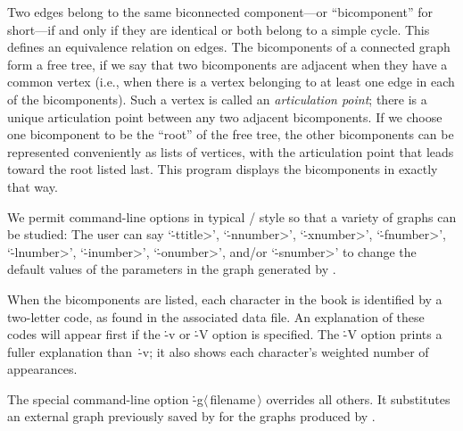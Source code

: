 Two edges belong to the same  biconnected component---or ``bicomponent''
for short---if and only if they are identical or both belong to a
simple cycle. This defines an equivalence relation on edges.
The bicomponents of a connected graph form a
free tree, if we say that two bicomponents are adjacent when they have
a common vertex (i.e., when there is a vertex belonging to at least one edge
in each of the bicomponents). Such a vertex is called an {\sl articulation
point\/}; there is a unique articulation point between any two adjacent
bicomponents. If we choose one bicomponent to be the ``root'' of the
free tree, the other bicomponents can be represented conveniently as
lists of vertices, with the articulation point that leads toward the root
listed last. This program displays the bicomponents in exactly that way.

\fi

We permit command-line options in typical \UNIX/ style so that a variety
of
graphs can be studied: The user can say `\.{-t}\<title>',
`\.{-n}\<number>', `\.{-x}\<number>', `\.{-f}\<number>',
`\.{-l}\<number>', `\.{-i}\<number>', `\.{-o}\<number>', and/or
`\.{-s}\<number>' to change the default values of the parameters in
the graph generated by .

When the bicomponents are listed, each character in the book is identified by
a two-letter code, as found in the associated data file.
An explanation of these codes will appear first if the \.{-v} or \.{-V} option
is specified. The \.{-V} option prints a fuller explanation than~\.{-v}; it
also shows each character's weighted number of appearances.

The special command-line option \.{-g}$\langle\,$filename$\,\rangle$
overrides all others. It substitutes an external graph previously saved by
 for the graphs produced by .



